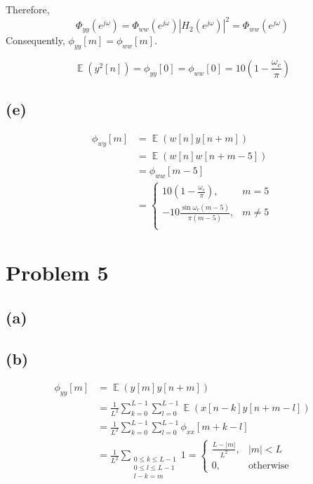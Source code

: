 \documentclass{article}
\DeclareMathOperator{\E}{\mathbb{E}}
\begin{document}
Therefore,
\begin{equation}
\Phi_{yy}(e^{j\omega}) = \Phi_{ww}(e^{j\omega})|H_2(e^{j\omega})|^2 = \Phi_{ww}(e^{j\omega})
\end{equation}
Consequently, $\phi_{yy}[m] = \phi_{ww}[m]$.

\begin{equation}
\E(y^2[n]) = \phi_{yy}[0] =  \phi_{ww}[0] = 10(1 - \frac{\omega_c}{\pi})
\end{equation}

\subsection{(e)}
\begin{align}\nonumber
\phi_{wy}[m] &= \E(w[n]y[n+m]) \\ 
&= \E(w[n]w[n+m-5]) \\ \nonumber
&= \phi_{ww}[m-5] \\
&=\begin{cases}
10(1-\frac{\omega_c}{\pi}), & m = 5 \\
-10\frac{\sin\omega_c(m-5)}{\pi(m-5)}, & m \neq 5 \\
\end{cases}
\end{align}
	
\section{Problem 5}
\subsection{(a)}

\begin{center}
	\resizebox{0.5\linewidth}{!}{}
\end{center}

\subsection{(b)}
\begin{align} \nonumber
\phi_{yy}[m] &= \E(y[m]y[n+m]) \\ \nonumber
&=\frac{1}{L^2}\sum_{k=0}^{L-1}\sum_{l=0}^{L-1} \E(x[n-k]y[n+m-l]) \\ \nonumber
&=\frac{1}{L^2}\sum_{k=0}^{L-1}\sum_{l=0}^{L-1} \phi_{xx}[m+k-l] \\
&=\frac{1}{L^2}\sum_{\substack{ 0\leq k \leq L-1 \\ 0\leq l\leq L-1 \\ l-k=m}} 1 = \begin{cases}
	\frac{L-|m|}{L^2}, & |m|<L \\
	0, & \text{otherwise}
\end{cases}
\end{align}
\end{document}
